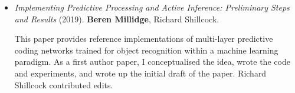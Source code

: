 \begin{itemize}

\item \emph{Implementing Predictive Processing and Active Inference: Preliminary Steps and Results} (2019). \textbf{Beren Millidge}, Richard Shillcock. 

This paper provides reference implementations of multi-layer predictive coding networks trained for object recognition within a machine learning paradigm. As a first author paper, I conceptualised the idea, wrote the code and experiments, and wrote up the initial draft of the paper. Richard Shillcock contributed edits.

\end{itemize}

